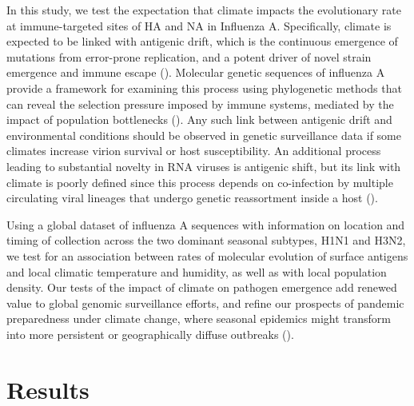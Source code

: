 \documentclass[11pt, a4paper]{article}
\begin{document}
In this study, we test the expectation that climate impacts the evolutionary rate at immune-targeted sites of HA and NA in Influenza A. Specifically, climate is expected to be linked with antigenic drift, which is the continuous emergence of mutations from error-prone replication, and a potent driver of novel strain emergence and immune escape (\cite{bedford_integrating_2014}). Molecular genetic sequences of influenza A provide a framework for examining this process using phylogenetic methods that can reveal the selection pressure imposed by immune systems, mediated by the impact of population bottlenecks (\cite{nelson_evolution_2007, wille_ecology_2020}). Any such link between antigenic drift and environmental conditions should be observed in genetic surveillance data if some climates increase virion survival or host susceptibility. An additional process leading to substantial novelty in RNA viruses is antigenic shift, but its link with climate is poorly defined since this process depends on co-infection by multiple circulating viral lineages that undergo genetic reassortment inside a host (\cite{nelson_evolution_2007}).

Using a global dataset of influenza A sequences with information on location and timing of collection across the two dominant seasonal subtypes, H1N1 and H3N2, we test for an association between rates of molecular evolution of surface antigens and local climatic temperature and humidity, as well as with local population density. Our tests of the impact of climate on pathogen emergence add renewed value to global genomic surveillance efforts, and refine our prospects of pandemic preparedness under climate change, where seasonal epidemics might transform into more persistent or geographically diffuse outbreaks (\cite{baker_implications_2021}).

\section*{Results}
\end{document}
